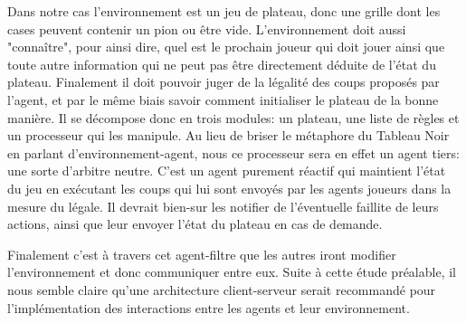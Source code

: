 Dans notre cas l'environnement est un jeu de plateau, donc une grille dont les cases peuvent contenir un pion ou être vide. L'environnement doit aussi "connaître", pour ainsi dire, quel est le prochain joueur qui doit jouer ainsi que toute autre information qui ne peut pas être directement déduite de l'état du plateau. Finalement il doit pouvoir juger de la légalité des coups proposés par l'agent, et par le même biais savoir comment initialiser le plateau de la bonne manière.
Il se décompose donc en trois modules: un plateau, une liste de règles et un processeur qui les manipule. Au lieu de briser le métaphore du \og Tableau Noir \fg{} en parlant d'environnement-agent, nous ce processeur sera en effet un agent tiers: une sorte d'arbitre neutre. C'est un agent purement réactif qui maintient l'état du jeu en exécutant les coups qui lui sont envoyés par les agents joueurs dans la mesure du légale. Il devrait bien-sur les notifier de l'éventuelle faillite de leurs actions, ainsi que leur envoyer l'état du plateau en cas de demande. 


Finalement c'est à travers cet agent-filtre que les autres iront modifier l'environnement et donc communiquer entre eux. Suite à cette étude préalable, il nous semble claire qu'une architecture client-serveur serait recommandé pour l'implémentation des interactions entre les agents et leur environnement.